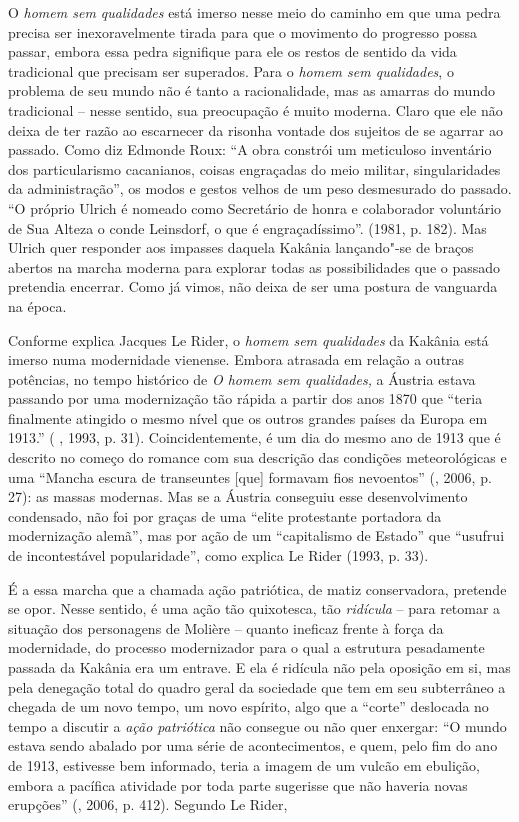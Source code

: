 O \emph{homem sem qualidades} está imerso nesse meio do caminho em que
uma pedra precisa ser inexoravelmente tirada para que o movimento do
progresso possa passar, embora essa pedra signifique para ele os restos
de sentido da vida tradicional que precisam ser superados. Para o
\emph{homem sem qualidades}, o problema de seu mundo não é tanto a
racionalidade, mas as amarras do mundo tradicional -- nesse sentido, sua
preocupação é muito moderna. Claro que ele não deixa de ter razão ao
escarnecer da risonha vontade dos sujeitos de se agarrar ao passado.
Como diz Edmonde Roux: ``A obra constrói um meticuloso inventário dos
particularismo cacanianos, coisas engraçadas do meio militar,
singularidades da administração'', os modos e gestos velhos de um peso
desmesurado do passado. ``O próprio Ulrich é nomeado como Secretário de
honra e colaborador voluntário de Sua Alteza o conde Leinsdorf, o que é
engraçadíssimo''. (1981, p. 182). Mas Ulrich quer responder aos impasses
daquela Kakânia lançando"-se de braços abertos na marcha moderna para
explorar todas as possibilidades que o passado pretendia encerrar. Como
já vimos, não deixa de ser uma postura de vanguarda na época.

Conforme explica Jacques Le Rider, o \emph{homem sem qualidades} da
Kakânia está imerso numa modernidade vienense. Embora atrasada em
relação a outras potências, no tempo histórico de \emph{O homem sem
qualidades,} a Áustria estava passando por uma modernização tão rápida a
partir dos anos 1870 que ``teria finalmente atingido o mesmo nível que
os outros grandes países da Europa em 1913.'' ( , 1993, p. 31).
Coincidentemente, é um dia do mesmo ano de 1913 que é descrito no começo
do romance com sua descrição das condições meteorológicas e uma ``Mancha
escura de transeuntes [que] formavam fios nevoentos'' (, 2006,
p. 27): as massas modernas. Mas se a Áustria conseguiu esse
desenvolvimento condensado, não foi por graças de uma ``elite
protestante portadora da modernização alemã'', mas por ação de um
``capitalismo de Estado'' que ``usufrui de incontestável popularidade'',
como explica Le Rider (1993, p. 33).

É a essa marcha que a chamada ação patriótica, de matiz conservadora,
pretende se opor. Nesse sentido, é uma ação tão quixotesca, tão
\emph{ridícula} -- para retomar a situação dos personagens de Molière --
quanto ineficaz frente à força da modernidade, do processo modernizador
para o qual a estrutura pesadamente passada da Kakânia era um entrave. E
ela é ridícula não pela oposição em si, mas pela denegação total do
quadro geral da sociedade que tem em seu subterrâneo a chegada de um
novo tempo, um novo espírito, algo que a ``corte'' deslocada no tempo a
discutir a \emph{ação patriótica} não consegue ou não quer enxergar: ``O
mundo estava sendo abalado por uma série de acontecimentos, e quem, pelo
fim do ano de 1913, estivesse bem informado, teria a imagem de um vulcão
em ebulição, embora a pacífica atividade por toda parte sugerisse que
não haveria novas erupções'' (, 2006, p. 412). Segundo Le Rider,

